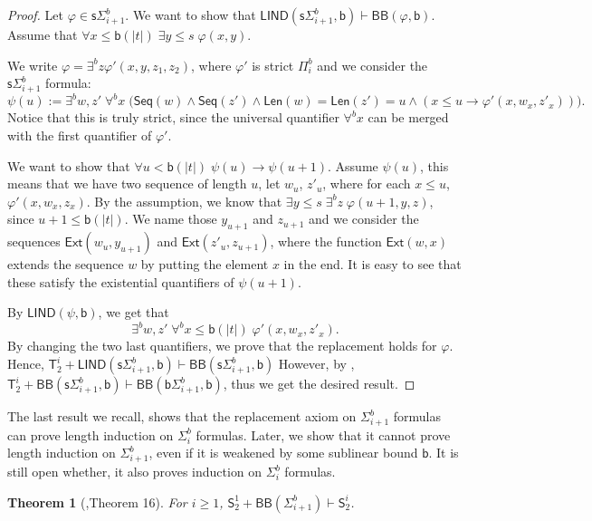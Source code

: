 \documentclass[11pt]{article}
\newcommand{\SOT}{\mathsf{S}^1_2}
\newcommand{\bd}{\mathsf{b}}
\newcommand{\abs}[1]{\lvert #1 \rvert}
\newtheorem{theorem}{Theorem}[section]
\theoremstyle{definition}
\theoremstyle{definition}
\theoremstyle{remark}
\begin{document}
\begin{proof}
    Let $\varphi\in \mathsf{s}\Sigma^b_{i+1}$. We want to show that $\mathsf{LIND}(\mathsf{s}\Sigma^b_{i+1},\bd) \vdash \mathsf{BB}(\varphi,\bd)$. Assume that $\forall x\leq \bd(\abs{t}) \;\exists y\leq s \; \varphi(x,y)$.

We write $\varphi = \exists^b z \varphi'(x,y,z_1,z_2)$, where $\varphi'$ is strict $\Pi^b_i$ and we consider the $\mathsf{s}\Sigma^b_{i+1}$ formula:
$$
\psi(u):= \exists^b w, z' \;\forall^b x \; \Big(\mathsf{Seq}(w) \land \mathsf{Seq}(z') \land \mathsf{Len}(w)= \mathsf{Len}(z')=u \land (x\leq u \rightarrow \varphi'(x,w_x,z'_x))\Big).
$$
Notice that this is truly strict, since the universal quantifier $\forall^b x $ can be merged with the first quantifier of $\varphi'$.

We want to show that $\forall u< \bd(\abs{t}) \;\psi(u)\rightarrow \psi(u+1)$. Assume $\psi(u)$, this means that we have two sequence of length $u$, let $w_u$, $z'_u$, where for each $x\leq u$, $\varphi'(x,w_x,z_x)$. By the assumption, we know that $\exists y\leq s\; \exists^b z \;\varphi(u+1,y,z)$, since $u+1\leq \bd(\abs{t})$. We name those $y_{u+1}$ and $z_{u+1}$ and we consider the sequences $\mathsf{Ext}(w_u,y_{u+1})$ and $\mathsf{Ext}(z'_u,z_{u+1})$, where the function $\mathsf{Ext}(w,x)$ extends the sequence $w$ by putting the element $x$ in the end. It is easy to see that these satisfy the existential quantifiers of $\psi(u+1)$.

By $\mathsf{LIND}(\psi,\bd)$, we get that 
$$
\exists^b w, z' \;\forall^b x\leq \bd(\abs{t}) \; \varphi'(x,w_x,z'_x).
$$
By changing the two last quantifiers, we prove that the replacement holds for $\varphi$. Hence, $\mathsf{T}^{i}_2 + \mathsf{LIND}(\mathsf{s}\Sigma^b_{i+1},\bd) \vdash \mathsf{BB}(\mathsf{s}\Sigma^b_{i+1},\bd)$ However, by , $\mathsf{T}^{i}_2 + \mathsf{BB}(\mathsf{s}\Sigma^b_{i+1},\bd) \vdash \mathsf{BB}(\bd\Sigma^b_{i+1},\bd)$, thus we get the desired result.
\end{proof}


The last result we recall, shows that the replacement axiom on $\Sigma^b_{i+1}$ formulas can prove length induction on $\Sigma^b_i$ formulas. Later, we show that it cannot prove length induction on $\Sigma^b_{i+1}$, even if it is weakened by some sublinear bound $\bd$. It is still open whether, it also proves induction on $\Sigma^b_i$ formulas.

\begin{theorem}[\cite{buss1985bounded},Theorem 16]\label{theorembbproveslind}
    For $i\geq 1$, $\SOT + \mathsf{BB}(\Sigma^b_{i+1}) \vdash \mathsf{S}^i_2$.
\end{theorem}
\end{document}
